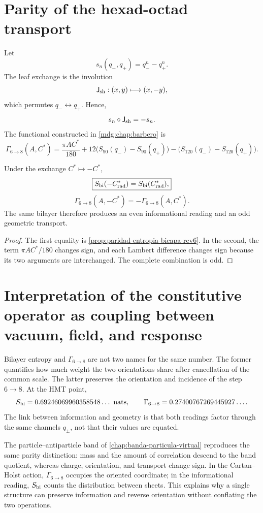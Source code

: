 \section{Parity of the hexad-octad transport}

Let
\[
 s_n(q_-,q_+)=q_-^n-q_+^n.
\]
The leaf exchange is the involution
\[
 \mathsf J_{\rm sh}:(x,y)\longmapsto(x,-y),
\]
which permutes \(q_-\leftrightarrow q_+\). Hence,
\[
 s_n\circ\mathsf J_{\rm sh}=-s_n.
\]
The functional constructed in \cref{mdg:chap:barbero} is
\[
 \Gamma_{6\to8}(A,C^*)
 =
 \frac{\pi A C^*}{180}
{}+12\bigl(S_{90}(q_-)-S_{90}(q_+)\bigr)
-\bigl(S_{120}(q_-)-S_{120}(q_+)\bigr).
\]

\begin{theorem}
\label{thm:paridad-bicapa-barbero-rev6}
Under the exchange \(C^*\mapsto-C^*\),
\[
 \boxed{S_{\rm bi}(-C^*_{\rm rad})
        =S_{\rm bi}(C^*_{\rm rad}),}
\]
\[
 \boxed{\Gamma_{6\to8}(A,-C^*)
        =-\Gamma_{6\to8}(A,C^*).}
\]
The same bilayer therefore produces an even informational reading and an odd geometric transport.
\end{theorem}

\begin{proof}
The first equality is
\cref{prop:paridad-entropia-bicapa-rev6}. In the second, the term
\(\pi AC^*/180\) changes sign, and each Lambert difference changes
sign because its two arguments are interchanged. The complete combination is
odd.
\end{proof}

\section{Interpretation of the constitutive operator as coupling between vacuum, field, and response}

Bilayer entropy and \(\Gamma_{6\to8}\) are not two names for the same
number. The former quantifies how much weight the two orientations share
after cancellation of the common scale. The latter preserves the orientation and
incidence of the step \(6\to8\). At the HMT point,
\[
 S_{\rm bi}
 =0.69246069960358548\ldots\ {\rm nats},
 \qquad
 \Gamma_{6\to8}
 =0.27400767269445927\ldots.
\]
The link between information and geometry is that both readings
factor through the same channels \(q_\pm\), not that their values are equated.

The particle--antiparticle band of
\cref{chap:banda-particula-virtual} reproduces the same parity distinction:
mass and the amount of correlation descend to the band quotient,
whereas charge, orientation, and transport change sign. In the
Cartan--Holst action, \(\Gamma_{6\to8}\) occupies the oriented coordinate;
in the informational reading, \(S_{\rm bi}\) counts the distribution between
sheets. This explains why a single structure can preserve
information and reverse orientation without conflating the two operations.
